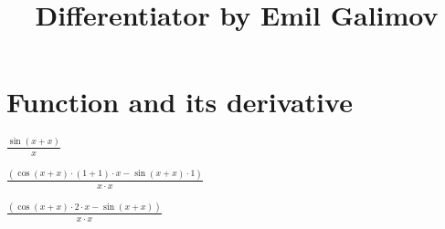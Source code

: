 \documentclass{article}
\title{Differentiator by Emil Galimov}
\begin{document}
\maketitle
\section{Function and its derivative}
\begin{center}
$\frac{ \sin{(x+x)}}{x}$\\
\end{center}
\begin{center}
$\frac{( \cos{(x+x)} \cdot (1+1) \cdot x- \sin{(x+x)} \cdot 1)}{x \cdot x}$\\
\end{center}
\begin{center}
$\frac{( \cos{(x+x)} \cdot 2 \cdot x- \sin{(x+x)})}{x \cdot x}$\\
\end{center}
\end{document}
